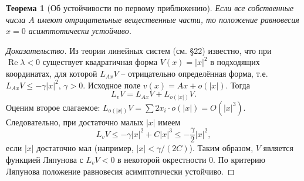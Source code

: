 \documentclass[a4paper,12pt]{article}
\newtheorem{theorem}{Теорема}
\theoremstyle{definition}
\begin{document}
\begin{theorem}[Об устойчивости по первому приближению]
	Если все собственные числа $A$ имеют отрицательные вещественные части, то положение равновесия $x=0$ асимптотически устойчиво.
\end{theorem}
\begin{proof}[Доказательство]
	Из теории линейных систем (см. §22) известно, что при $\operatorname{Re}\lambda<0$ существует квадратичная форма $V(x)=|x|^2$ в подходящих координатах, для которой $L_{Ax}V$ – отрицательно определённая форма, т.е. $L_{Ax}V\le -\gamma|x|^2$, $\gamma>0$.
	Исходное поле $v(x)=Ax+o(|x|)$. Тогда
	\[
	L_v V = L_{Ax}V + L_{o(|x|)}V.
	\]
	Оценим второе слагаемое: $L_{o(|x|)}V = \sum 2x_i\cdot o(|x|)=O(|x|^3)$. Следовательно, при достаточно малых $|x|$ имеем
	\[
	L_v V \le -\gamma|x|^2 + C|x|^3 \le -\frac{\gamma}{2}|x|^2,
	\]
	если $|x|$ достаточно мал (например, $|x|<\gamma/(2C)$). Таким образом, $V$ является функцией Ляпунова с $L_v V<0$ в некоторой окрестности $0$. По критерию Ляпунова положение равновесия асимптотически устойчиво.
\end{proof}
\end{document}
